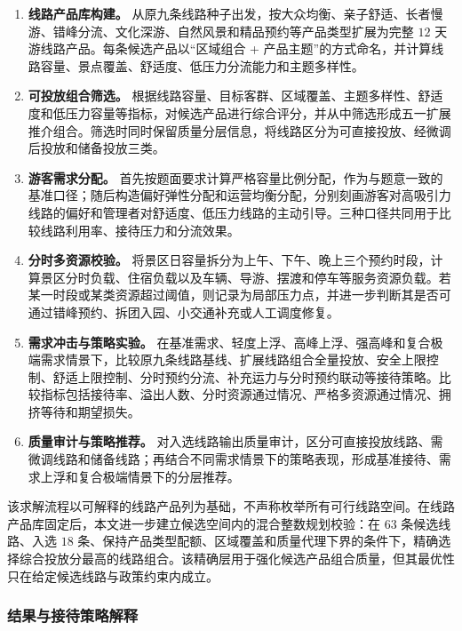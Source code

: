 \documentclass[UTF8,zihao=-4,a4paper]{ctexart}
\begin{document}
\begin{enumerate}
    \item \textbf{线路产品库构建。}
    从原九条线路种子出发，按大众均衡、亲子舒适、长者慢游、错峰分流、文化深游、自然风景和精品预约等产品类型扩展为完整 $12$ 天游线路产品。每条候选产品以“区域组合 + 产品主题”的方式命名，并计算线路容量、景点覆盖、舒适度、低压力分流能力和主题多样性。

    \item \textbf{可投放组合筛选。}
    根据线路容量、目标客群、区域覆盖、主题多样性、舒适度和低压力容量等指标，对候选产品进行综合评分，并从中筛选形成五一扩展推介组合。筛选时同时保留质量分层信息，将线路区分为可直接投放、经微调后投放和储备投放三类。

    \item \textbf{游客需求分配。}
    首先按题面要求计算严格容量比例分配，作为与题意一致的基准口径；随后构造偏好弹性分配和运营均衡分配，分别刻画游客对高吸引力线路的偏好和管理者对舒适度、低压力线路的主动引导。三种口径共同用于比较线路利用率、接待压力和分流效果。

    \item \textbf{分时多资源校验。}
    将景区日容量拆分为上午、下午、晚上三个预约时段，计算景区分时负载、住宿负载以及车辆、导游、摆渡和停车等服务资源负载。若某一时段或某类资源超过阈值，则记录为局部压力点，并进一步判断其是否可通过错峰预约、拆团入园、小交通补充或人工调度修复。

    \item \textbf{需求冲击与策略实验。}
    在基准需求、轻度上浮、高峰上浮、强高峰和复合极端需求情景下，比较原九条线路基线、扩展线路组合全量投放、安全上限控制、舒适上限控制、分时预约分流、补充运力与分时预约联动等接待策略。比较指标包括接待率、溢出人数、分时资源通过情况、严格多资源通过情况、拥挤等待和期望损失。

    \item \textbf{质量审计与策略推荐。}
    对入选线路输出质量审计，区分可直接投放线路、需微调线路和储备线路；再结合不同需求情景下的策略表现，形成基准接待、需求上浮和复合极端情景下的分层推荐。
\end{enumerate}

该求解流程以可解释的线路产品列为基础，不声称枚举所有可行线路空间。在线路产品库固定后，本文进一步建立候选空间内的混合整数规划校验：在 $63$ 条候选线路、入选 $18$ 条、保持产品类型配额、区域覆盖和质量代理下界的条件下，精确选择综合投放分最高的线路组合。该精确层用于强化候选产品组合质量，但其最优性只在给定候选线路与政策约束内成立。

\subsubsection{结果与接待策略解释}
\label{subsubsec:q4_results}
\end{document}
